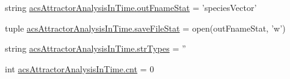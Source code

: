 \begin{DoxyCompactItemize}
\item 
string \hyperlink{a00097_a05e902a00f3333a303563029c80605de}{acs\-Attractor\-Analysis\-In\-Time.\-out\-Fname\-Stat} = 'species\-Vector'
\item 
tuple \hyperlink{a00097_a372b8cd0e4d3200958e9c61e3a276fb1}{acs\-Attractor\-Analysis\-In\-Time.\-save\-File\-Stat} = open(out\-Fname\-Stat, 'w')
\item 
string \hyperlink{a00097_a80aeec3ef5cc335351588c6f7c4b76cb}{acs\-Attractor\-Analysis\-In\-Time.\-str\-Types} = ''
\item 
int \hyperlink{a00097_aabada0bdbcd7fb71d37a9310d32f0a28}{acs\-Attractor\-Analysis\-In\-Time.\-cnt} = 0
\end{DoxyCompactItemize}
